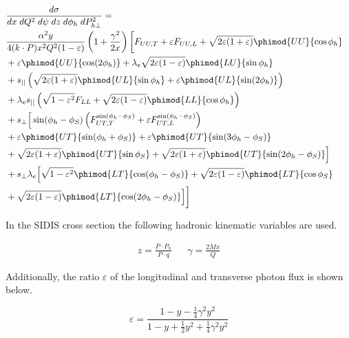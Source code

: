 \begin{eqnarray*} \label{e:crossmaster}
        \lefteqn{\frac{d\sigma}{dx \; dQ^2 \; d\psi \; dz \; d\phi_h \; dP_{h\perp}^2} = } \\
         & \frac{\alpha^2 y}{4 (k \cdot P) x^2 Q^2 (1 - \varepsilon)} \left( 1 +
        \frac{\gamma^2}{2x}\right) \biggl[ F_{UU,T} + \varepsilon F_{UU,L} + \sqrt{2 \varepsilon (1 + \varepsilon)} \phimod{UU}{\cos\phi_h} \notag \\
        & + \varepsilon \phimod{UU}{\cos(2\phi_h)} + \lambda_e \sqrt{2 \varepsilon (1 - \varepsilon)} \phimod{LU}{\sin\phi_h} \notag \\
        & + s_{||} \left( \sqrt{2 \varepsilon (1 + \varepsilon)} \phimod{UL}{\sin\phi_h} + \varepsilon \phimod{UL}{\sin(2\phi_h)} \right) \notag \\
        & + \lambda_e s_{||} \left( \sqrt{1 - \varepsilon^2} F_{LL} +  \sqrt{2 \varepsilon (1 - \varepsilon)} \phimod{LL}{\cos\phi_h} \right) \notag \\
        & + s_\perp \Big[ \sin(\phi_h-\phi_S) \left( F_{UT,T}^{\sin(\phi_h-\phi_S)} + \varepsilon F_{UT,L}^{\sin(\phi_h-\phi_S)} \right) \notag \\
        & + \varepsilon \phimod{UT}{\sin(\phi_h+\phi_S)} + \varepsilon \phimod{UT}{\sin(3\phi_h-\phi_S)} \notag \\
        & + \sqrt{2\varepsilon(1+\varepsilon)} \phimod{UT}{\sin\phi_S} +  \sqrt{2\varepsilon(1+\varepsilon)} \phimod{UT}{\sin(2\phi_h-\phi_S)} \Big] \notag \\
        & + s_\perp \lambda_e \Big[ \sqrt{1-\varepsilon^2} \phimod{LT}{\cos(\phi_h-\phi_S)} + \sqrt{2\varepsilon(1-\varepsilon)} \phimod{LT}{\cos\phi_S} \notag \\
        & + \sqrt{2\varepsilon(1-\varepsilon)} \phimod{LT}{\cos(2\phi_h-\phi_S)} \Big] \biggr]
\end{eqnarray*}

In the SIDIS cross section the following hadronic kinematic variables are used. 

\begin{align}
  z = \frac{P \cdot P_{h}}{P \cdot q} && \gamma = \frac{2Mx}{Q}
\end{align}

Additionally, the ratio $\varepsilon$ of the longitudinal and transverse photon flux is shown below.

\begin{equation}
	\varepsilon = \frac{1 - y - \frac{1}{4}\gamma^2 y^2}{1 - y + \frac{1}{2}y^2 + \frac{1}{4}\gamma^2 y^2}
\end{equation}

